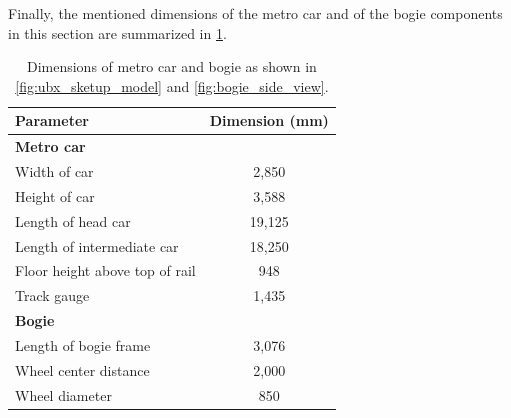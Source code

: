 Finally, the mentioned dimensions of the metro car and of the bogie components in this section are summarized in \cref{tab:vehicle_dimensions}.
\begin{table}[H]
	\caption{Dimensions of metro car and bogie as shown in \cref{fig:ubx_sketup_model} and \cref{fig:bogie_side_view}.}
	\centering
	\begin{tabular}{lc}
		\toprule
		Parameter                    	   &  Dimension (mm)    \\
		\midrule
		\textbf{Metro car} 				   & 		 \\
		Width of car                       & 2,850   \\
		Height of car  					   & 3,588   \\
		Length of head car  			   & 19,125  \\
		Length of intermediate car 		   & 18,250  \\
		Floor height above top of rail     & 948     \\
		Track gauge              		   & 1,435   \\
		\textbf{Bogie} 					   & 		 \\
		Length of bogie frame    		   & 3,076   \\
		Wheel center distance 			   & 2,000   \\ 
		Wheel diameter  				   & 850     \\ 
		\bottomrule
	\end{tabular}
	\label{tab:vehicle_dimensions}
\end{table}